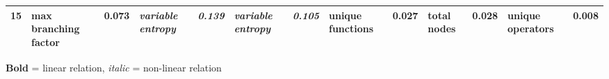 \begin{table}[htbp]
{\begin{tabular}{lllllllllllll}
15   & max branching factor        & 0.073          & \textit{variable entropy}   & \textit{0.139} & \textit{variable entropy}   & \textit{0.105} & unique functions            & 0.027          & total nodes                 & 0.028          & unique operators            & 0.008          \\
\hline
\end{tabular}
}\footnotesize{ \textbf{Bold} = linear relation, \textit{italic} = non-linear relation}
\label{tab:feature_ranking}
\end{table}